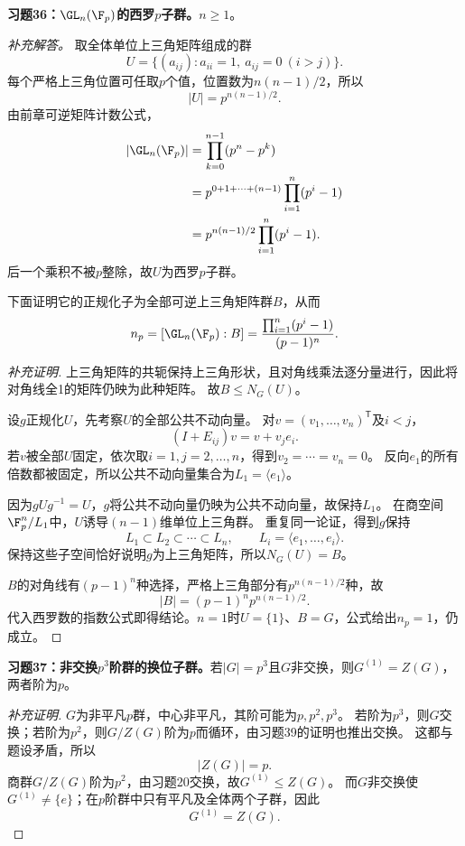\begin{problem}
\textbf{习题36：$\GL_n(\F_p)$的西罗$p$子群。}$n\geq1$。
\end{problem}
\begin{solution}
\textit{补充解答。}
取全体单位上三角矩阵组成的群
\[
U=\{(a_{ij}):a_{ii}=1,\ a_{ij}=0\ (i>j)\}.
\]
每个严格上三角位置可任取$p$个值，位置数为$n(n-1)/2$，所以
\[
|U|=p^{n(n-1)/2}.
\]
由前章可逆矩阵计数公式，
\begin{align*}
|\GL_n(\F_p)|
&=\prod_{k=0}^{n-1}(p^n-p^k)\\
&=p^{0+1+\cdots+(n-1)}\prod_{i=1}^n(p^i-1)\\
&=p^{n(n-1)/2}\prod_{i=1}^n(p^i-1).
\end{align*}
后一个乘积不被$p$整除，故$U$为西罗$p$子群。

下面证明它的正规化子为全部可逆上三角矩阵群$B$，从而
\[
n_p=[\GL_n(\F_p):B]
=\frac{\prod_{i=1}^n(p^i-1)}{(p-1)^n}.
\]
\end{solution}
\begin{proof}[补充证明]
上三角矩阵的共轭保持上三角形状，且对角线乘法逐分量进行，因此将对角线全1的矩阵仍映为此种矩阵。
故$B\leq N_G(U)$。

设$g$正规化$U$，先考察$U$的全部公共不动向量。
对$v=(v_1,\ldots,v_n)^{\mathsf T}$及$i<j$，
\[
(I+E_{ij})v=v+v_je_i.
\]
若$v$被全部$U$固定，依次取$i=1,j=2,\ldots,n$，得到$v_2=\cdots=v_n=0$。
反向$e_1$的所有倍数都被固定，所以公共不动向量集合为$L_1=\langle e_1\rangle$。

因为$gUg^{-1}=U$，$g$将公共不动向量仍映为公共不动向量，故保持$L_1$。
在商空间$\F_p^n/L_1$中，$U$诱导$(n-1)$维单位上三角群。
重复同一论证，得到$g$保持
\[
L_1\subset L_2\subset\cdots\subset L_n,
\qquad L_i=\langle e_1,\ldots,e_i\rangle.
\]
保持这些子空间恰好说明$g$为上三角矩阵，所以$N_G(U)=B$。

$B$的对角线有$(p-1)^n$种选择，严格上三角部分有$p^{n(n-1)/2}$种，故
\[
|B|=(p-1)^np^{n(n-1)/2}.
\]
代入西罗数的指数公式即得结论。$n=1$时$U=\{1\}$、$B=G$，公式给出$n_p=1$，仍成立。
\end{proof}

\begin{problem}
\textbf{习题37：非交换$p^3$阶群的换位子群。}若$|G|=p^3$且$G$非交换，则$G^{(1)}=Z(G)$，两者阶为$p$。
\end{problem}
\begin{proof}[补充证明]
$G$为非平凡$p$群，中心非平凡，其阶可能为$p,p^2,p^3$。
若阶为$p^3$，则$G$交换；若阶为$p^2$，则$G/Z(G)$阶为$p$而循环，由习题39的证明也推出交换。
这都与题设矛盾，所以
\[
|Z(G)|=p.
\]
商群$G/Z(G)$阶为$p^2$，由习题20交换，故$G^{(1)}\leq Z(G)$。
而$G$非交换使$G^{(1)}\neq\{e\}$；在$p$阶群中只有平凡及全体两个子群，因此
\[
G^{(1)}=Z(G).
\]
\end{proof}


